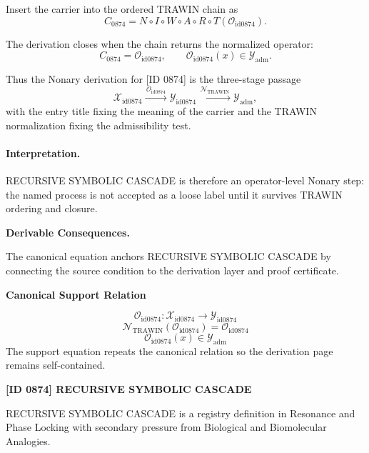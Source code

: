 Insert the carrier into the ordered TRAWIN chain as\[
C_{0874}=N\circ I\circ W\circ A\circ R\circ T(\mathcal{O}_{\mathrm{id0874}}).
\]

The derivation closes when the chain returns the normalized operator:\[
C_{0874}=\mathcal{O}_{\mathrm{id0874}},\qquad \mathcal{O}_{\mathrm{id0874}}(x)\in\mathcal{Y}_{\mathrm{adm}}.
\]

Thus the Nonary derivation for [ID 0874] is the three-stage passage
\[
\mathcal{X}_{\mathrm{id0874}}\xrightarrow{\,\mathcal{O}_{\mathrm{id0874}}\,} \mathcal{Y}_{\mathrm{id0874}}\xrightarrow{\,\mathcal{N}_{\mathrm{TRAWIN}}\,} \mathcal{Y}_{\mathrm{adm}},
\]
with the entry title fixing the meaning of the carrier and the TRAWIN normalization fixing the admissibility test.

\paragraph{Interpretation.} RECURSIVE SYMBOLIC CASCADE is therefore an operator-level Nonary step: the named process is not accepted as a loose label until it survives TRAWIN ordering and closure.

\par\vspace{0.35em}
\noindent\textbf{Derivable Consequences.}\quad
\begingroup
\footnotesize
\raggedright
The canonical equation anchors RECURSIVE SYMBOLIC CASCADE by connecting the source condition to the derivation layer and proof certificate.
\par\endgroup

\noindent\textbf{Canonical Support Relation}\par
\[
\mathcal{O}_{\mathrm{id0874}}:\mathcal{X}_{\mathrm{id0874}}\longrightarrow\mathcal{Y}_{\mathrm{id0874}}
\]
\[
\mathcal{N}_{\mathrm{TRAWIN}}(\mathcal{O}_{\mathrm{id0874}})=\mathcal{O}_{\mathrm{id0874}}
\]
\[
\mathcal{O}_{\mathrm{id0874}}(x)\in\mathcal{Y}_{\mathrm{adm}}
\]
\noindent The support equation repeats the canonical relation so the derivation page remains self-contained.\par

\clearpage
\noindent\textbf{[ID 0874] RECURSIVE SYMBOLIC CASCADE}\par
\vspace{0.35em}
\begingroup\small
{}
RECURSIVE SYMBOLIC CASCADE is a registry definition in Resonance and Phase Locking with secondary pressure from Biological and Biomolecular Analogies.

